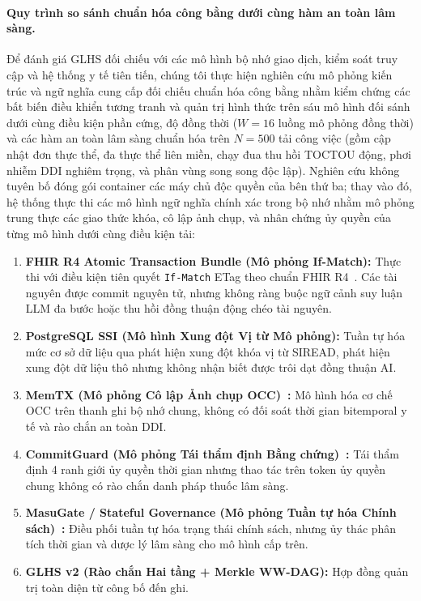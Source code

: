 \documentclass[11pt]{article}
\begin{document}
\paragraph{Quy trình so sánh chuẩn hóa công bằng dưới cùng hàm an toàn lâm sàng.}
Để đánh giá GLHS đối chiếu với các mô hình bộ nhớ giao dịch, kiểm soát truy cập và hệ thống y tế tiên tiến, chúng tôi thực hiện nghiên cứu mô phỏng kiến trúc và ngữ nghĩa cung cấp đối chiếu chuẩn hóa công bằng nhằm kiểm chứng các bất biến điều khiển tương tranh và quản trị hình thức trên sáu mô hình đối sánh dưới cùng điều kiện phần cứng, độ đồng thời ($W=16$ luồng mô phỏng đồng thời) và các hàm an toàn lâm sàng chuẩn hóa trên $N=500$ tải công việc (gồm cập nhật đơn thực thể, đa thực thể liên miền, chạy đua thu hồi TOCTOU động, phơi nhiễm DDI nghiêm trọng, và phân vùng song song độc lập). Nghiên cứu không tuyên bố đóng gói container các máy chủ độc quyền của bên thứ ba; thay vào đó, hệ thống thực thi các mô hình ngữ nghĩa chính xác trong bộ nhớ nhằm mô phỏng trung thực các giao thức khóa, cô lập ảnh chụp, và nhân chứng ủy quyền của từng mô hình dưới cùng điều kiện tải:
\begin{enumerate}
  \item \textbf{FHIR R4 Atomic Transaction Bundle (Mô phỏng If-Match):} Thực thi với điều kiện tiên quyết \texttt{If-Match} ETag theo chuẩn FHIR R4~\cite{fhirhttp}. Các tài nguyên được commit nguyên tử, nhưng không ràng buộc ngữ cảnh suy luận LLM đa bước hoặc thu hồi đồng thuận động chéo tài nguyên.
  \item \textbf{PostgreSQL SSI (Mô hình Xung đột Vị từ Mô phỏng):} Tuần tự hóa mức cơ sở dữ liệu qua phát hiện xung đột khóa vị từ SIREAD, phát hiện xung đột dữ liệu thô nhưng không nhận biết được trôi dạt đồng thuận AI.
  \item \textbf{MemTX (Mô phỏng Cô lập Ảnh chụp OCC)~\cite{memtx}:} Mô hình hóa cơ chế OCC trên thanh ghi bộ nhớ chung, không có đối soát thời gian bitemporal y tế và rào chắn an toàn DDI.
  \item \textbf{CommitGuard (Mô phỏng Tái thẩm định Bằng chứng)~\cite{temporaryauth}:} Tái thẩm định 4 ranh giới ủy quyền thời gian nhưng thao tác trên token ủy quyền chung không có rào chắn danh pháp thuốc lâm sàng.
  \item \textbf{MasuGate / Stateful Governance (Mô phỏng Tuần tự hóa Chính sách)~\cite{statefulgov}:} Điều phối tuần tự hóa trạng thái chính sách, nhưng ủy thác phân tích thời gian và dược lý lâm sàng cho mô hình cấp trên.
  \item \textbf{GLHS v2 (Rào chắn Hai tầng + Merkle WW-DAG):} Hợp đồng quản trị toàn diện từ công bố đến ghi.
\end{enumerate}
\end{document}
